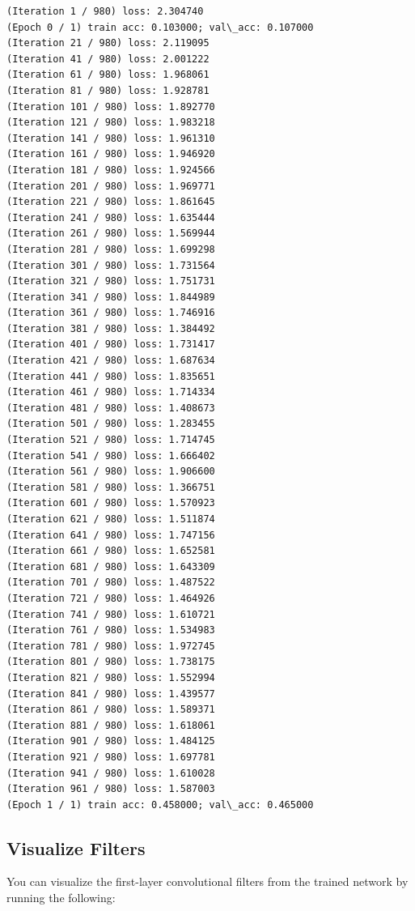 \documentclass[11pt]{article}
\begin{document}
    \begin{Verbatim}[commandchars=\\\{\}]
(Iteration 1 / 980) loss: 2.304740
(Epoch 0 / 1) train acc: 0.103000; val\_acc: 0.107000
(Iteration 21 / 980) loss: 2.119095
(Iteration 41 / 980) loss: 2.001222
(Iteration 61 / 980) loss: 1.968061
(Iteration 81 / 980) loss: 1.928781
(Iteration 101 / 980) loss: 1.892770
(Iteration 121 / 980) loss: 1.983218
(Iteration 141 / 980) loss: 1.961310
(Iteration 161 / 980) loss: 1.946920
(Iteration 181 / 980) loss: 1.924566
(Iteration 201 / 980) loss: 1.969771
(Iteration 221 / 980) loss: 1.861645
(Iteration 241 / 980) loss: 1.635444
(Iteration 261 / 980) loss: 1.569944
(Iteration 281 / 980) loss: 1.699298
(Iteration 301 / 980) loss: 1.731564
(Iteration 321 / 980) loss: 1.751731
(Iteration 341 / 980) loss: 1.844989
(Iteration 361 / 980) loss: 1.746916
(Iteration 381 / 980) loss: 1.384492
(Iteration 401 / 980) loss: 1.731417
(Iteration 421 / 980) loss: 1.687634
(Iteration 441 / 980) loss: 1.835651
(Iteration 461 / 980) loss: 1.714334
(Iteration 481 / 980) loss: 1.408673
(Iteration 501 / 980) loss: 1.283455
(Iteration 521 / 980) loss: 1.714745
(Iteration 541 / 980) loss: 1.666402
(Iteration 561 / 980) loss: 1.906600
(Iteration 581 / 980) loss: 1.366751
(Iteration 601 / 980) loss: 1.570923
(Iteration 621 / 980) loss: 1.511874
(Iteration 641 / 980) loss: 1.747156
(Iteration 661 / 980) loss: 1.652581
(Iteration 681 / 980) loss: 1.643309
(Iteration 701 / 980) loss: 1.487522
(Iteration 721 / 980) loss: 1.464926
(Iteration 741 / 980) loss: 1.610721
(Iteration 761 / 980) loss: 1.534983
(Iteration 781 / 980) loss: 1.972745
(Iteration 801 / 980) loss: 1.738175
(Iteration 821 / 980) loss: 1.552994
(Iteration 841 / 980) loss: 1.439577
(Iteration 861 / 980) loss: 1.589371
(Iteration 881 / 980) loss: 1.618061
(Iteration 901 / 980) loss: 1.484125
(Iteration 921 / 980) loss: 1.697781
(Iteration 941 / 980) loss: 1.610028
(Iteration 961 / 980) loss: 1.587003
(Epoch 1 / 1) train acc: 0.458000; val\_acc: 0.465000

    \end{Verbatim}

    \subsection{Visualize Filters}\label{visualize-filters}

You can visualize the first-layer convolutional filters from the trained
network by running the following:
\end{document}
